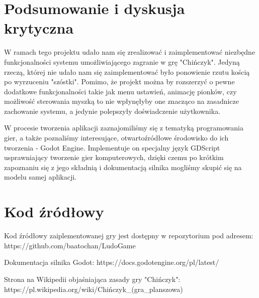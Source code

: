 \documentclass[conference]{IEEEtran}
\begin{document}
\section{Podsumowanie i dyskusja krytyczna}
W ramach tego projektu udało nam się zrealizować i zaimplementować niezbędne funkcjonalności systemu umożliwiającego zagranie w grę "Chińczyk". Jedyną rzeczą, której nie udało nam się zaimplementować było ponowienie rzutu kością po wyrzuceniu "szóstki". Pomimo, że projekt można by rozszerzyć o pewne dodatkowe funkcjonalności takie jak menu ustawień, animację pionków, czy możliwość sterowania myszką to nie wpłynęłyby one znacząco na zasadnicze zachowanie systemu, a jedynie polepszyły doświadczenie użytkownika. \par
W procesie tworzenia aplikacji zaznajomiliśmy się z tematyką programowania gier, a także poznaliśmy interesujące, otwartoźródłowe środowisko do ich tworzenia - Godot Engine. Implementuje on specjalny język GDScript usprawniający tworzenie gier komputerowych, dzięki czemu po krótkim zapoznaniu się z jego składnią i dokumentacją silnika mogliśmy skupić się na modelu samej aplikacji.

\section*{Kod źródłowy}
Kod źródłowy zaiplementowanej gry jest dostępny w repozytorium pod adresem: https://github.com/baatochan/LudoGame

\begin{thebibliography}{00}
Dokumentacja silnika Godot: https://docs.godotengine.org/pl/latest/

Strona na Wikipedii objaśniająca zasady gry "Chińczyk": https://pl.wikipedia.org/wiki/Chińczyk\_(gra\_planszowa)

\end{thebibliography}
\end{document}
